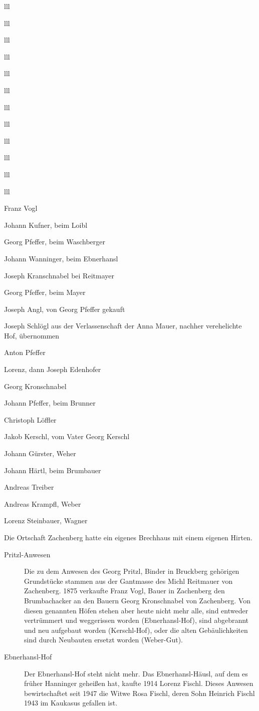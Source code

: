 \documentclass[12pt,a4pager]{book}
\begin{document}
\begin{tabuluar}{lll}
\begin{tabuluar}{lll}
\begin{tabuluar}{lll}
\begin{tabuluar}{lll}
\begin{tabuluar}{lll}
\begin{tabuluar}{lll}
\begin{tabuluar}{lll}
\begin{tabuluar}{lll}
\begin{tabuluar}{lll}
\begin{tabuluar}{lll}
\begin{tabuluar}{lll}
\begin{tabuluar}{lll}
\begin{compactitem}
\item Franz Vogl
\item Johann Kufner, beim Loibl
\item Georg Pfeffer, beim Waschberger
\item Johann Wanninger, beim Ebnerhansl
\item Joseph Kranschnabel bei Reitmayer
\item Georg Pfeffer, beim Mayer
\item Joseph Angl, von Georg Pfeffer gekauft
\item Joseph Schlögl aus der Verlassenschaft der Anna Mauer, nachher
verehelichte Hof, übernommen
\item Anton Pfeffer
\item Lorenz, dann Joseph Edenhofer
\item Georg Kronschnabel
\item Johann Pfeffer, beim Brunner
\item Christoph Löffler
\item Jakob Kerschl, vom Vater Georg Kerschl
\item Johann Gürster, Weher
\item Johann Härtl, beim Brumbauer
\item Andreas Treiber
\item Andreas Krampfl, Weber
\item Lorenz Steinbauer, Wagner
\end{compactitem}

Die Ortschaft Zachenberg hatte ein eigenes Brechhaus mit einem eigenen Hirten.

\begin{description}
\item[Pritzl-Anwesen] Die zu dem Anwesen des Georg Pritzl, Binder in Bruckberg
gehörigen Grundstücke stammen aus der Gantmasse des Michl Reitmauer von
Zachenberg. 1875 verkaufte Franz Vogl, Bauer in Zachenberg den Brumbachacker an
den Bauern Georg Kronschnabel von Zachenberg. Von diesen genannten Höfen stehen
aber heute nicht mehr alle, sind entweder vertrümmert und weggerissen worden
(Ebnerhansl-Hof), sind abgebrannt und neu aufgebaut worden (Kerschl-Hof), oder
die alten Gebäulichkeiten sind durch Neubauten ersetzt worden (Weber-Gut).

\item[Ebnerhansl-Hof] Der Ebnerhansl-Hof steht nicht mehr. Das Ebnerhansl-Häusl,
auf dem es früher Hanninger geheißen hat, kaufte 1914 Lorenz Fischl. Dieses
Anwesen bewirtschaftet seit 1947 die Witwe Rosa Fischl, deren Sohn Heinrich
Fischl 1943 im Kaukasus gefallen ist.


\end{description}
\end{tabuluar}
\end{tabuluar}
\end{tabuluar}
\end{tabuluar}
\end{tabuluar}
\end{tabuluar}
\end{tabuluar}
\end{tabuluar}
\end{tabuluar}
\end{tabuluar}
\end{tabuluar}
\end{tabuluar}
\end{document}
